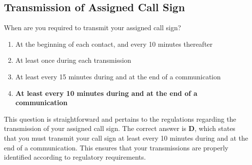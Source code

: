 \subsection{Transmission of Assigned Call Sign}
\label{T1F03}

\begin{tcolorbox}[colback=gray!10!white,colframe=black!75!black,title=T1F03]
When are you required to transmit your assigned call sign?
\begin{enumerate}[label=\Alph*,noitemsep]
    \item At the beginning of each contact, and every 10 minutes thereafter
    \item At least once during each transmission
    \item At least every 15 minutes during and at the end of a communication
    \item \textbf{At least every 10 minutes during and at the end of a communication}
\end{enumerate}
\end{tcolorbox}

This question is straightforward and pertains to the regulations regarding the transmission of your assigned call sign. The correct answer is \textbf{D}, which states that you must transmit your call sign at least every 10 minutes during and at the end of a communication. This ensures that your transmissions are properly identified according to regulatory requirements.
